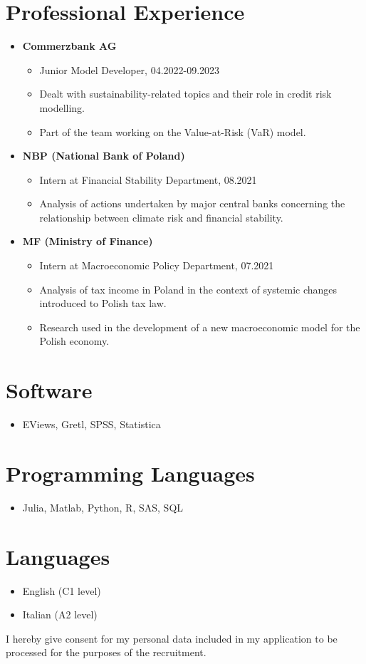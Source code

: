 \documentclass[a4paper,10pt]{article}
\begin{document}
\section*{Professional Experience}
\begin{itemize}
    \item \textbf{Commerzbank AG}
    \begin{itemize}
        \item Junior Model Developer, 04.2022-09.2023
        \item Dealt with sustainability-related topics and their role in credit risk modelling.
        \item Part of the team working on the Value-at-Risk (VaR) model.
    \end{itemize}
    \item \textbf{NBP (National Bank of Poland)}
    \begin{itemize}
        \item Intern at Financial Stability Department, 08.2021
        \item Analysis of actions undertaken by major central banks concerning the relationship between climate risk and financial stability.
    \end{itemize}
    \item \textbf{MF (Ministry of Finance)}
    \begin{itemize}
        \item Intern at Macroeconomic Policy Department, 07.2021
        \item Analysis of tax income in Poland in the context of systemic changes introduced to Polish tax law.
        \item Research used in the development of a new macroeconomic model for the Polish economy.
    \end{itemize}
\end{itemize}

\section*{Software}
\begin{itemize}[label=]
    \item EViews, Gretl, SPSS, Statistica
\end{itemize}

\section*{Programming Languages}
\begin{itemize}[label=]
    \item Julia, Matlab, Python, R, SAS, SQL
\end{itemize}

\section*{Languages}
\begin{itemize}[label=]
    \item English (C1 level)
    \item Italian (A2 level)
\end{itemize}

I hereby give consent for my personal data included in my application to be processed for the purposes of the recruitment.
\end{document}

